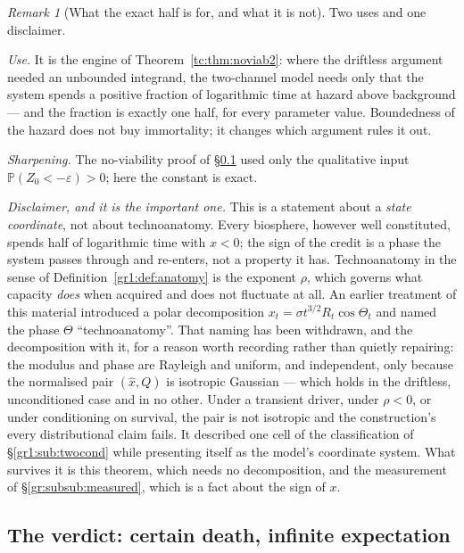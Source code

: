 \documentclass[11pt]{article}
\numberwithin{equation}{section}
\theoremstyle{plain}
\theoremstyle{definition}
\theoremstyle{remark}
\newtheorem{remark}[theorem]{Remark}
\newcommand{\PP}{\mathbb{P}}
\begin{document}
\begin{remark}[What the exact half is for, and what it is not]
\label{gr1:rem:halfuse}
Two uses and one disclaimer.

\emph{Use.} It is the engine of Theorem~\ref{tc:thm:noviab2}: where the
driftless argument needed an unbounded integrand, the two-channel model
needs only that the system spends a positive fraction of logarithmic
time at hazard above background --- and the fraction is exactly one
half, for every parameter value. Boundedness of the hazard does not buy
immortality; it changes which argument rules it out.

\emph{Sharpening.} The no-viability proof of
\S\ref{gr1:sub:verdict} used only the qualitative input
$\PP(Z_0<-\varepsilon)>0$; here the constant is exact.

\emph{Disclaimer, and it is the important one.} This is a statement
about a \emph{state coordinate}, not about technoanatomy. Every
biosphere, however well constituted, spends half of logarithmic time
with $x<0$; the sign of the credit is a phase the system passes
through and re-enters, not a property it has. Technoanatomy in the
sense of Definition~\ref{gr1:def:anatomy} is the exponent $\rho$, which
governs what capacity \emph{does} when acquired and does not fluctuate
at all. An earlier treatment of this material introduced a polar
decomposition $x_t=\sigma t^{3/2}R_t\cos\Theta_t$ and named the phase
$\Theta$ ``technoanatomy''. That naming has been withdrawn, and the
decomposition with it, for a reason worth recording rather than
quietly repairing: the modulus and phase are Rayleigh and uniform, and
independent, only because the normalised pair $(\hat x,Q)$ is isotropic
Gaussian --- which holds in the driftless, unconditioned case and in no
other. Under a transient driver, under $\rho<0$, or under conditioning
on survival, the pair is not isotropic and the construction's every
distributional claim fails. It described one cell of the classification
of \S\ref{gr1:sub:twocond} while presenting itself as the model's
coordinate system. What survives it is this theorem, which needs no
decomposition, and the measurement of \S\ref{gr:subsub:measured}, which
is a fact about the sign of $x$.
\end{remark}


\subsection{The verdict: certain death, infinite expectation}\label{gr1:sub:verdict}\label{sh:sub:verdict}
\end{document}
